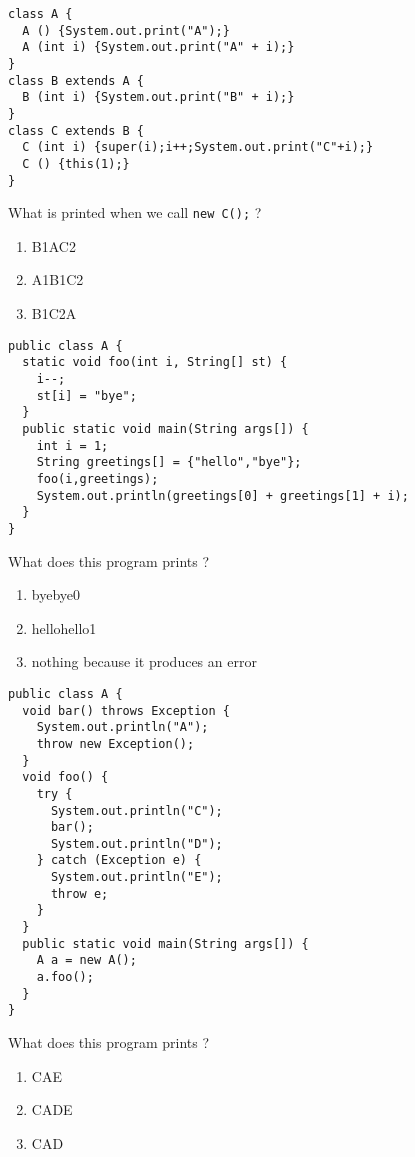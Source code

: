 \documentclass[correction]{exercices}
\begin{document}
\begin{question}
\hfill

\begin{verbatim}
class A {
  A () {System.out.print("A");}
  A (int i) {System.out.print("A" + i);}
}
class B extends A {
  B (int i) {System.out.print("B" + i);}
}
class C extends B {
  C (int i) {super(i);i++;System.out.print("C"+i);}
  C () {this(1);}
}
\end{verbatim}

What is printed when we call \lstinline!new C();! ?
\begin{multicols}{2}
\begin{enumerate}
\item B1AC2
\item A1B1C2
\item B1C2A
\end{enumerate}
\end{multicols}
\end{question}

\begin{question} \hfill
\begin{verbatim}
public class A {
  static void foo(int i, String[] st) {
    i--;
    st[i] = "bye";
  }
  public static void main(String args[]) {
    int i = 1;
    String greetings[] = {"hello","bye"}; 
    foo(i,greetings);
    System.out.println(greetings[0] + greetings[1] + i);
  }
}
\end{verbatim}

What does this program prints ?
\begin{multicols}{2}
\begin{enumerate}
\item byebye0
\item hellohello1
\item nothing because it produces an error
\end{enumerate}
\end{multicols}
\end{question}

\begin{question} \hfill
\begin{verbatim}
public class A {
  void bar() throws Exception {
    System.out.println("A");
    throw new Exception();
  }
  void foo() {
    try {
      System.out.println("C");
      bar();
      System.out.println("D");
    } catch (Exception e) {
      System.out.println("E");
      throw e;
    }
  }
  public static void main(String args[]) {
    A a = new A();
    a.foo();
  }
}
\end{verbatim}

What does this program prints ?
\begin{multicols}{2}
\begin{enumerate}
\item CAE
\item CADE
\item CAD
\end{enumerate}
\end{multicols}
\end{question}
\end{document}
